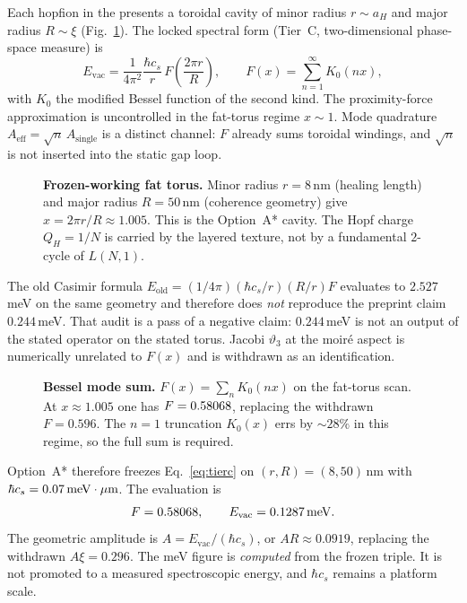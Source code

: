 \documentclass[11pt,letterpaper]{article}
\begin{document}
Each hopfion in the \TEVC{} presents a toroidal cavity of minor radius $r\sim a_H$ and major radius $R\sim\xi$ (Fig.~\ref{fig:torus}). The locked spectral form (Tier~C, two-dimensional phase-space measure) is
\begin{equation}
E_{\mathrm{vac}}=\frac{1}{4\pi^2}\frac{\hbar c_s}{r}\,F\!\left(\frac{2\pi r}{R}\right),\qquad
F(x)=\sum_{n=1}^\infty K_0(nx),
\label{eq:tierc}
\end{equation}
with $K_0$ the modified Bessel function of the second kind. The proximity-force approximation is uncontrolled in the fat-torus regime $x\sim 1$. Mode quadrature $A_{\mathrm{eff}}=\sqrt{n}\,A_{\mathrm{single}}$ is a distinct channel: $F$ already sums toroidal windings, and $\sqrt{n}$ is not inserted into the static gap loop.

\begin{figure}[H]
\centering

\caption{\textbf{Frozen-working fat torus.} Minor radius $r=8$\,nm (healing length) and major radius $R=50$\,nm (coherence geometry) give $x=2\pi r/R\approx 1.005$. This is the Option~A* cavity. The Hopf charge $Q_H=1/N$ is carried by the layered texture, not by a fundamental $2$-cycle of $L(N,1)$.}
\label{fig:torus}
\end{figure}

The old Casimir formula $E_{\mathrm{old}}=(1/4\pi)(\hbar c_s/r)(R/r)F$ evaluates to $2.527$\,meV on the same geometry and therefore does \emph{not} reproduce the preprint claim $0.244$\,meV. That audit is a pass of a negative claim: $0.244$\,meV is not an output of the stated operator on the stated torus. Jacobi $\vartheta_3$ at the moir\'e aspect is numerically unrelated to $F(x)$ and is withdrawn as an identification.

\begin{figure}[H]
\centering

\caption{\textbf{Bessel mode sum.} $F(x)=\sum_n K_0(nx)$ on the fat-torus scan. At $x\approx 1.005$ one has $F=0.58068$, replacing the withdrawn $F=0.596$. The $n=1$ truncation $K_0(x)$ errs by $\sim 28\%$ in this regime, so the full sum is required.}
\label{fig:Fbessel}
\end{figure}

Option~A* therefore freezes Eq.~\eqref{eq:tierc} on $(r,R)=(8,50)$\,nm with $\hbar c_s=0.07\,\mathrm{meV\cdot\mu m}$. The evaluation is
\begin{equation}
F=0.58068,\qquad E_{\mathrm{vac}}=0.1287\,\mathrm{meV}.
\end{equation}
The geometric amplitude is $A=E_{\mathrm{vac}}/(\hbar c_s)$, or $AR\approx 0.0919$, replacing the withdrawn $A\xi=0.296$. The meV figure is \emph{computed} from the frozen triple. It is not promoted to a measured \MATBG{} spectroscopic energy, and $\hbar c_s$ remains a platform scale.
\end{document}
